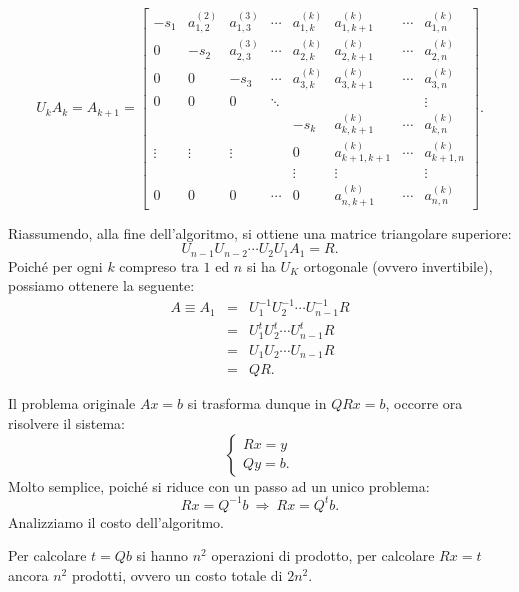 \[U_kA_k = A_{k+1} = \left[
\begin{array}{cccccccc}
-s_1   &a_{1,2}^{(2)} &a_{1,3}^{(3)} &\cdots &a_{1,k}^{(k)}&a_{1,k+1}^{(k)}   &\cdots
 &a_{1,n}^{(k)}\\
0      &-s_2        &a_{2,3}^{(3)} &\cdots &a_{2,k}^{(k)}&a_{2,k+1}^{(k)}   &\cdots
 &a_{2,n}^{(k)}\\
0      &0           &-s_3        &\cdots &a_{3,k}^{(k)}&a_{3,k+1}^{(k)}   &\cdots
 &a_{3,n}^{(k)}\\
0      &0           &0           &\ddots &            &              &
&\vdots\\
       &            &            &       &-s_k        &a_{k,k+1}^{(k)}  &\cdots
 &a_{k,n}^{(k)}\\
\vdots &\vdots      &\vdots      &       & 0          &a_{k+1,k+1}^{(k)}&\cdots
 &a_{k+1,n}^{(k)}\\
       &            &            &       &\vdots      &\vdots        &
&\vdots\\
0      &0           &0           &\cdots &0           &a_{n,k+1}^{(k)}&\cdots
&a_{n,n}^{(k)}
\end{array}
\right].\]

Riassumendo, alla fine dell'algoritmo, si ottiene una matrice triangolare
superiore:
\[U_{n-1}U_{n-2}\cdots U_2U_1A_1 = R.\]
Poiché per ogni $k$ compreso tra $1$ ed $n$ si ha $U_K$ ortogonale (ovvero
invertibile), possiamo ottenere la seguente:
\[
\begin{array}{lcl}
A \equiv A_1 & = & U_1^{-1}U_2^{-1}\cdots U_{n-1}^{-1}R \\
             & = & U_1^{t}U_2^{t}\cdots U_{n-1}^{t}R \\
             & = & U_1U_2\cdots U_{n-1}R \\
& = & QR.
\end{array}
\]

Il problema originale $Ax=b$ si trasforma dunque in $QRx = b$, occorre ora
risolvere il sistema:
\[\left\{
\begin{array}{l}Rx = y \\ Qy = b.
\end{array}
\right.\]
Molto semplice, poiché si riduce con un passo ad un unico problema:
\[Rx = Q^{-1}b\ \Longrightarrow\ Rx = Q^tb.\]
Analizziamo il costo dell'algoritmo.
\begin{flushleft}
Per calcolare $t = Qb$ si hanno $n^2$ operazioni di prodotto, per calcolare
$Rx = t$ ancora $n^2$ prodotti, ovvero un costo totale di $2n^2$.
\end{flushleft}

